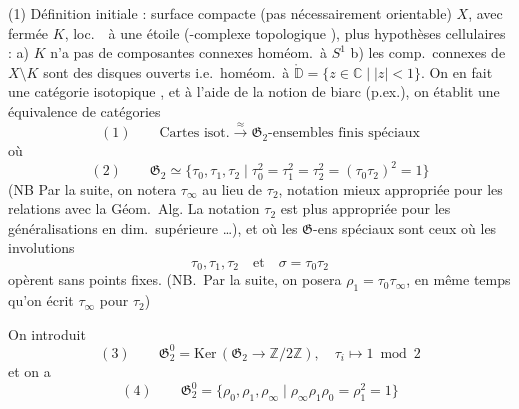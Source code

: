 \documentclass[11pt,a4paper]{article}
\begin{document}
(1) Définition initiale  : surface compacte (pas nécessairement orientable) $X$, avec \struck{\ill{}} fermée $K$, loc.\ \ à une étoile (-complexe topologique \fg), plus hypothèses \og cellulaires \fg : a) $K$ n'a pas de composantes connexes homéom.\ à $S^{1}$   b) les comp.\ connexes de $X \setminus K$ sont des disques ouverts i.e.\ homéom.\ à $\mathring{\mathbb{D}} = \{z \in \mathbb{C} \mid |z| < 1\}$. On en fait une \og catégorie isotopique \fg, et à l'aide de la notion de biarc (p.ex.), on établit une équivalence de catégories
\[
  (1)\qquad \text{Cartes isot.} \xrightarrow{\ \approx\ } \mathfrak{G}_{2}\text{-ensembles finis spéciaux}
\]
où
\[
  (2)\qquad \mathfrak{G}_{2} \simeq \{\tau_{0}, \tau_{1}, \tau_{2} \mid \tau_{0}^{2} = \tau_{1}^{2} = \tau_{2}^{2} = (\tau_{0}\tau_{2})^{2} = 1\}
\]
(NB Par la suite, on notera $\tau_{\infty}$ au lieu de $\tau_{2}$, notation \struck{\ill{}} mieux appropriée pour les relations avec la Géom.\ Alg. La notation $\tau_{2}$ est plus appropriée pour les généralisations en dim.\ supérieure …), et où les $\mathfrak{G}$-ens \og spéciaux \fg{} sont ceux où les involutions
\[
  \tau_{0}, \tau_{1}, \tau_{2} \quad \text{et} \quad \sigma = \tau_{0}\tau_{2}
\]
opèrent sans points fixes. (NB.\ Par la suite, on posera $\rho_{1} = \tau_{0}\tau_{\infty}$, en même temps qu'on écrit $\tau_{\infty}$ pour $\tau_{2}$)

On introduit
\[
  (3)\qquad \mathfrak{G}_{2}^{0} = \mathrm{Ker}\,(\mathfrak{G}_{2} \to \mathbb{Z}/2\mathbb{Z}), \quad \tau_{i} \mapsto 1 \bmod 2
\]
et on a
\[
  (4)\qquad \mathfrak{G}_{2}^{0} = \{\rho_{0}, \rho_{1}, \rho_{\infty} \mid \rho_{\infty}\rho_{1}\rho_{0} = \rho_{1}^{2} = 1\}
\]


\end{document}
